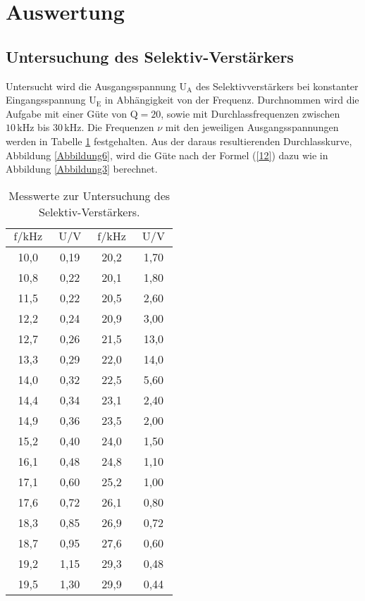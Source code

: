 \section{Auswertung} 

\subsection{Untersuchung des Selektiv-Verstärkers}

\begin{flushleft}
    Untersucht wird die Ausgangsspannung $\text{U}_{\text{A}}$ des Selektivverstärkers bei konstanter Eingangsspannung $\text{U}_{\text{E}}$ in Abhängigkeit von der Frequenz. 
    Durchnommen wird die Aufgabe mit einer Güte von $\text{Q} = 20$, sowie mit Durchlassfrequenzen zwischen $10\,\unit{\kilo\hertz}$ bis $30\,\unit{\kilo\hertz}$.
    Die Frequenzen $\nu$ mit den jeweiligen Ausgangsspannungen werden in Tabelle \ref{Tabelle1} festgehalten. 
    Aus der daraus resultierenden Durchlasskurve, Abbildung \ref{Abbildung6}, wird die Güte nach der Formel (\ref{12}) dazu wie in Abbildung \ref{Abbildung3} berechnet.
\end{flushleft}

\begin{table}[H]
    \centering
    \caption{Messwerte zur Untersuchung des Selektiv-Verstärkers.} 
    \label{Tabelle1}
    \begin{tabular} {c  c  c  c}
        \toprule
        {$ \text{f} \mathbin{/} \unit{\kilo\hertz} $} &
        {$ \text{U} \mathbin{/} \unit{\volt} $} &
        {$ \text{f} \mathbin{/} \unit{\kilo\hertz} $} &
        {$ \text{U} \mathbin{/} \unit{\volt} $} \\
        \midrule
        10,0 & 0,19 & 20,2 & 1,70 \\
        10,8 & 0,22 & 20,1 & 1,80 \\
        11,5 & 0,22 & 20,5 & 2,60 \\
        12,2 & 0,24 & 20,9 & 3,00 \\
        12,7 & 0,26 & 21,5 & 13,0 \\
        13,3 & 0,29 & 22,0 & 14,0 \\
        14,0 & 0,32 & 22,5 & 5,60 \\
        14,4 & 0,34 & 23,1 & 2,40 \\
        14,9 & 0,36 & 23,5 & 2,00 \\
        15,2 & 0,40 & 24,0 & 1,50 \\
        16,1 & 0,48 & 24,8 & 1,10 \\
        17,1 & 0,60 & 25,2 & 1,00 \\
        17,6 & 0,72 & 26,1 & 0,80 \\
        18,3 & 0,85 & 26,9 & 0,72 \\
        18,7 & 0,95 & 27,6 & 0,60 \\
        19,2 & 1,15 & 29,3 & 0,48 \\
        19,5 & 1,30 & 29,9 & 0,44 \\
        \bottomrule
    \end{tabular} 
\end{table}

